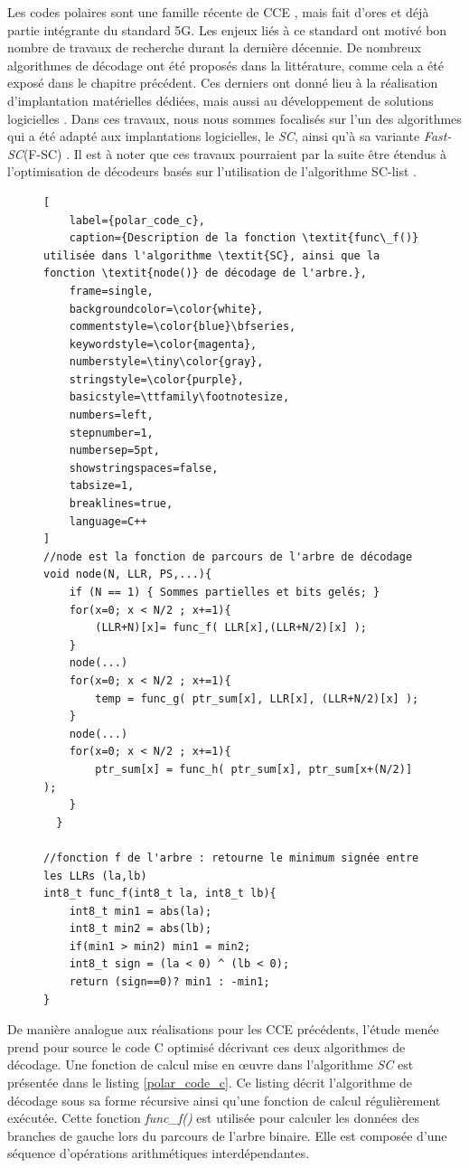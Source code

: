 \documentclass[../main.tex]{subfiles}
\begin{document}
Les codes polaires sont une famille récente de CCE \cite{Arikan_2009}, mais fait d'ores et déjà partie intégrante du standard 5G. Les enjeux liés à ce standard ont motivé bon nombre de travaux de recherche durant la dernière décennie. De nombreux algorithmes de décodage ont été proposés dans la littérature, comme cela a été exposé dans le chapitre précédent. Ces derniers ont donné lieu à la réalisation d'implantation matérielles dédiées, mais aussi au développement de solutions logicielles \cite{mcgill,Leonardon:2019vf}.
Dans ces travaux, nous nous sommes focalisés sur l'un des algorithmes qui a été adapté aux implantations logicielles, le \textit{SC}, ainsi qu'à sa variante \textit{Fast-SC}(F-SC) \cite{92}.
Il est à noter que ces travaux pourraient par la suite être étendus à l'optimisation de décodeurs basés sur l'utilisation de l'algorithme SC-list \cite{LEONARDON:SCL}.

\begin{figure}[tb]
\begin{lstlisting}[
    label={polar_code_c},
    caption={Description de la fonction \textit{func\_f()} utilisée dans l'algorithme \textit{SC}, ainsi que la fonction \textit{node()} de décodage de l'arbre.},
    frame=single,
    backgroundcolor=\color{white},  
    commentstyle=\color{blue}\bfseries,
    keywordstyle=\color{magenta},
    numberstyle=\tiny\color{gray},
    stringstyle=\color{purple},
    basicstyle=\ttfamily\footnotesize,
    numbers=left,
    stepnumber=1,
    numbersep=5pt,                 
    showstringspaces=false,
    tabsize=1,
    breaklines=true,
    language=C++
]
//node est la fonction de parcours de l'arbre de décodage 
void node(N, LLR, PS,...){
    if (N == 1) { Sommes partielles et bits gelés; }
    for(x=0; x < N/2 ; x+=1){
        (LLR+N)[x]= func_f( LLR[x],(LLR+N/2)[x] );
    }
    node(...)
    for(x=0; x < N/2 ; x+=1){
        temp = func_g( ptr_sum[x], LLR[x], (LLR+N/2)[x] );
    }
    node(...)
    for(x=0; x < N/2 ; x+=1){
        ptr_sum[x] = func_h( ptr_sum[x], ptr_sum[x+(N/2)] );
    }
  }

//fonction f de l'arbre : retourne le minimum signée entre les LLRs (la,lb)
int8_t func_f(int8_t la, int8_t lb){
    int8_t min1 = abs(la);
    int8_t min2 = abs(lb);
    if(min1 > min2) min1 = min2;
    int8_t sign = (la < 0) ^ (lb < 0);
    return (sign==0)? min1 : -min1;
}
\end{lstlisting}
\end{figure}
De manière analogue aux réalisations pour les CCE précédents, l'étude menée prend pour source le code C optimisé décrivant ces deux algorithmes de décodage. Une fonction de calcul mise en œuvre dans l'algorithme \textit{SC} est présentée dans le listing \ref{polar_code_c}. Ce listing décrit l'algorithme de décodage sous sa forme récursive ainsi qu'une fonction de calcul régulièrement exécutée. Cette fonction \textit{func\_f()} est utilisée pour calculer les données des branches de gauche lors du parcours de l'arbre binaire. Elle est composée d'une séquence d'opérations arithmétiques interdépendantes.
\end{document}
